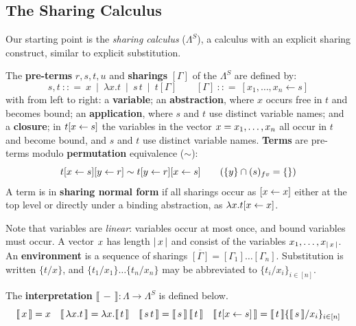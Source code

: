 \documentclass[runningheads]{llncs}
\let\vec\relax
\newcommand\defn{\textbf}
\newcommand{\SLC}{\Lambda^{S}}
\newcommand{\fv}[1]{(#1)_{fv}}
\newcommand{\set}[1]{ \{ #1 \} }
\newcommand{\abs}[2]{\lambda #1 . #2}
\newcommand{\app}[2]{#1 \, #2}
\newcommand{\share}[3]{#1 [#2 \leftarrow #3]}
\newcommand{\size}[1]{\vert \, #1 \, \vert}
\newcommand{\sub}[3]{#1 \{ #2 / #3 \}}
\newcommand{\readbackclose}[1]{\llbracket \, #1 \, \rrbracket }
\begin{document}
\subsection{The Sharing Calculus}

Our starting point is the \emph{sharing calculus} ($\SLC$), a calculus with an explicit sharing construct, similar to explicit substitution.

\begin{definition}
\label{def:sharingcalsyntax}
The \defn{pre-terms} $r,s,t,u$ and \defn{sharings} $[\Gamma]$ of the $\SLC$ are defined by:
\[
	s,t 
	~{:}{:}{=}~ x 
	~\mid~ \abs xt 
	~\mid~ \app st 
	~\mid~ t[\Gamma] 
\qquad
	[\Gamma] ~{:}{:}{=}~ \share{}{x_{1}, \dots, x_{n}}{s}
\]
with from left to right: a \defn{variable}; an \defn{abstraction}, where $x$ occurs free in $t$ and becomes bound; an \defn{application}, where $s$ and $t$ use distinct variable names; and a \defn{closure}; in $\share{t}{\vec{x}}{s}$ the variables in the vector $\vec{x} = x_{1}, \dots, x_{n}$ all occur in $t$ and become bound, and $s$ and $t$ use distinct variable names. \defn{Terms} are pre-terms modulo \defn{permutation} equivalence ($\sim$):
\[
	\share{t}{\vec{x}}{s} \share{}{\vec{y}}{r} \sim t \share{}{\vec{y}}{r} \share{}{\vec{x}}{s} \quad \quad (\set{\vec{y}} \cap \fv{s} = \set{} )
\]
A term is in \defn{sharing normal form} if all sharings occur as $\share{}{\vec{x}}{x}$ either at the top level or directly under a binding abstraction, as $\abs{x}{\share{t}{\vec{x}}{x}}$.
\end{definition}

\noindent Note that variables are \emph{linear}: variables occur at most once, and bound variables must occur. A vector $\vec{x}$ has length $\size{\vec{x}}$ and consist of the variables $x_{1}, \dots, x_{\size{\vec{x}}}$. An \defn{environment} is a sequence of sharings $\overline{[\Gamma]} = [\Gamma_{1}] \dots [\Gamma_{n}]$. Substitution is written $\sub{}{t}{x}$, and $\sub{}{t_{1}}{x_{1}} \dots \sub{}{t_{n}}{x_{n}}$ may be abbreviated to $\sub{}{t_{i}}{x_{i}}_{i \in [n]}$.

\begin{definition}
The \defn{interpretation} $\readbackclose{-} : \Lambda \rightarrow \SLC$ is defined below.
\[\readbackclose{x} = x \quad \readbackclose{\abs{x}{t}} = \abs{x}{\readbackclose{t}} \quad \readbackclose{\app{s}{t}} = \app{\readbackclose{s}}{\readbackclose{t}} \quad \readbackclose{\share{t}{\vec{x}}{s}} = \readbackclose{t} \sub{}{\readbackclose{s}}{x_{i}}_{i \in [n]}\]
\end{definition}
\end{document}
